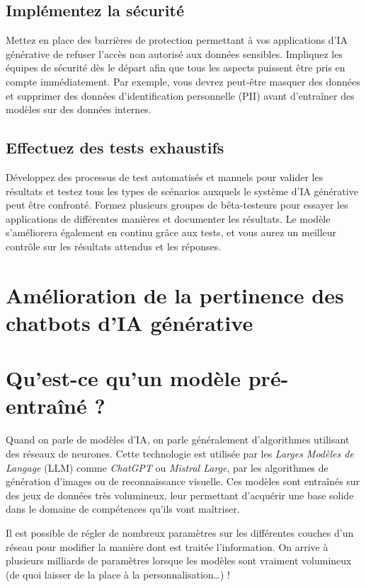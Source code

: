 \subsection*{Implémentez la sécurité}

Mettez en place des barrières de protection permettant à vos applications d'IA
générative de refuser l'accès non autorisé aux données sensibles. Impliquez les équipes
de sécurité dès le départ afin que tous les aspects puissent être pris en compte
immédiatement. Par exemple, vous devrez peut-être masquer des données et supprimer
des données d'identification personnelle (PII) avant d'entraîner des modèles sur
des données internes.

\subsection*{Effectuez des tests exhaustifs}

Développez des processus de test automatisés et manuels pour valider les
résultats et testez tous les types de scénarios auxquels le système d’IA
générative peut être confronté. Formez plusieurs groupes de bêta-testeurs pour essayer
les applications de différentes manières et documenter les résultats. Le modèle
s'améliorera également en continu grâce aux tests, et vous aurez un meilleur contrôle
sur les résultats attendus et les réponses.

\section{Amélioration de la pertinence des chatbots d'IA générative}
\section*{Qu’est-ce qu’un modèle pré-entraîné ?}

Quand on parle de modèles d’IA, on parle généralement d’algorithmes utilisant des
réseaux de neurones. Cette technologie est utilisée par les \textit{Larges
Modèles de Langage} (LLM) comme \textit{ChatGPT} ou \textit{Mistral Large}, par
les algorithmes de génération d’images ou de reconnaissance visuelle. Ces modèles
sont entraînés sur des jeux de données très volumineux, leur permettant
d’acquérir une base solide dans le domaine de compétences qu’ils vont maîtriser.

Il est possible de régler de nombreux paramètres sur les différentes couches
d’un réseau pour modifier la manière dont est traitée l’information. On arrive à
plusieurs milliards de paramètres lorsque les modèles sont vraiment volumineux (de
quoi laisser de la place à la personnalisation\ldots) !

